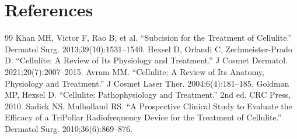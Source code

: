 \section*{References}
\begin{thebibliography}{99}
 Khan MH, Victor F, Rao B, et al. ``Subcision for the Treatment of Cellulite.'' Dermatol Surg. 2013;39(10):1531--1540.
 Hexsel D, Orlandi C, Zechmeister-Prado D. ``Cellulite: A Review of Its Physiology and Treatment.'' J Cosmet Dermatol. 2021;20(7):2007--2015.
 Avram MM. ``Cellulite: A Review of Its Anatomy, Physiology and Treatment.'' J Cosmet Laser Ther. 2004;6(4):181--185.
 Goldman MP, Hexsel D. ``Cellulite: Pathophysiology and Treatment.'' 2nd ed. CRC Press, 2010.
 Sadick NS, Mulholland RS. ``A Prospective Clinical Study to Evaluate the Efficacy of a TriPollar Radiofrequency Device for the Treatment of Cellulite.'' Dermatol Surg. 2010;36(6):869--876.
\end{thebibliography}
